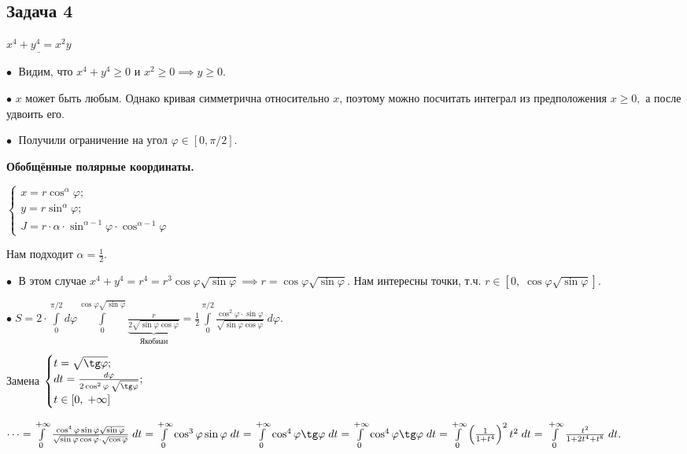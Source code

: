 \documentclass[a4paper, fleqn]{article}
\begin{document}
    
    \subsection*{Задача 4}
    
    $\underline{x^4 + y^4 = x^2 y}$
    
    $\bullet \; $ Видим, что $x^4 + y^4 \geq 0$ и $x^2 \geq 0 \implies y \geq 0.$
    
    $\bullet$ $x$ может быть любым. Однако кривая симметрична относительно $x$, поэтому можно посчитать интеграл из предположения $x \geq 0,$ а после удвоить его.
    
    $\bullet \; $ Получили ограничение на угол $\varphi \in [0, \pi/2].$
    
    \textbf{Обобщённые полярные координаты.}
    
    $\begin{cases}
    x = r \cos^{\alpha} \varphi;\\
    y = r \sin^{\alpha} \varphi;\\
    J = r \cdot \alpha \cdot  \sin^{\alpha - 1} \varphi \cdot \cos^{\alpha - 1} \varphi
    \end{cases}$
    
    Нам подходит $\alpha = \frac{1}{2}.$
    
    $\bullet \; $ В этом случае $x^4 + y^4 = r^4 = r^3 \cos \varphi \sqrt{\sin \varphi} \implies r = \cos \varphi \sqrt{\sin \varphi}.$ Нам интересны точки, т.ч. $r \in [0, \; \cos \varphi \sqrt{\sin \varphi}].$
    
    $\bullet \; S = 2 \cdot \int\limits_{0}^{\pi/2} d \varphi \int\limits_{0}^{\cos \varphi \sqrt{\sin \varphi}} \underbrace{\frac{r}{2 \sqrt{\sin \varphi \cos \varphi}}}_{\text{Якобиан}} = \frac{1}{2} \int\limits_{0}^{\pi/2} \frac{\cos^2 \varphi \cdot \sin \varphi}{\sqrt{\sin \varphi \cos \varphi}} \; d \varphi.$
    
    Замена $\begin{cases}
    t = \sqrt{\tg \varphi}; \\
    dt = \frac{d \varphi}{2 \cos^2 \varphi \; \sqrt{\tg \varphi}};\\
    t \in [0, \; +\infty]
    \end{cases}$
    
    $\dots = \int\limits_{0}^{+\infty} \frac{\cos^4 \varphi \sin \varphi \sqrt{\sin \varphi}}{\sqrt{\sin \varphi \cos \varphi} \cdot \sqrt{\cos \varphi}} \; dt = \int\limits_{0}^{+\infty} \cos^3  \varphi  \sin \varphi  \;  dt = 
    \int\limits_{0}^{+\infty} \cos^4  \varphi  \tg \varphi   \;  dt = 
    \int\limits_{0}^{+\infty} \cos^4  \varphi  \tg \varphi   \;  dt = \int\limits_{0}^{+\infty} \left( \frac{1}{1 + t^4}  \right)^2  t^2 \; dt = \\
    \int\limits_{0}^{+\infty}  \frac{t^2}{1 + 2t^4 +  t^8}    \; dt. $
\end{document}
